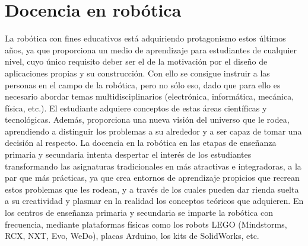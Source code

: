 \section{Docencia en robótica}
La robótica con fines educativos está adquiriendo protagonismo estos últimos años, ya que proporciona un medio de aprendizaje para estudiantes de cualquier nivel, cuyo único requisito deber ser el de la motivación por el diseño de aplicaciones propias y su construcción. Con ello se consigue instruir a las personas en el campo de la robótica, pero no sólo eso, dado que para ello es necesario abordar temas multidisciplinarios (electrónica, informática, mecánica, física, etc.). El estudiante adquiere conceptos de estas áreas científicas y tecnológicas. Además, proporciona una nueva visión del universo que le rodea, aprendiendo a distinguir los problemas  a su alrededor y a ser capaz de tomar una decisión al respecto.
La docencia en la robótica en las etapas de enseñanza primaria y secundaria intenta despertar el interés de los estudiantes transformando las asignaturas tradicionales en más atractivas e integradoras, a la par que más prácticas, ya que crea entornos de aprendizaje propicios que recrean estos problemas que les rodean, y a través de los cuales pueden dar rienda suelta a su creatividad y plasmar en la realidad los conceptos teóricos que adquieren.
En los centros de enseñanza primaria y secundaria se imparte la robótica con frecuencia, mediante plataformas físicas como los robots LEGO (Mindstorms, RCX, NXT, Evo, WeDo), placas Arduino, los kits de SolidWorks, etc. 

